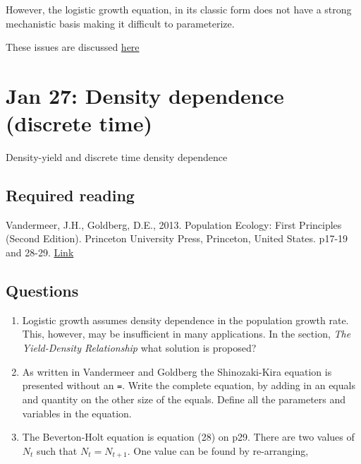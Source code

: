 \documentclass[
]{book}
\begin{document}
However, the logistic growth equation, in its classic form does not have a strong mechanistic basis making it difficult to parameterize.

These issues are discussed \href{https://www.sciencedirect.com/science/article/pii/S030438000400554X?via\%3Dihub}{here}

\hypertarget{jan-27-density-dependence-discrete-time}{%
\chapter{Jan 27: Density dependence (discrete time)}\label{jan-27-density-dependence-discrete-time}}

Density-yield and discrete time density dependence

\hypertarget{required-reading-2}{%
\section{Required reading}\label{required-reading-2}}

Vandermeer, J.H., Goldberg, D.E., 2013. Population Ecology: First Principles (Second Edition). Princeton University Press, Princeton, United States. p17-19 and 28-29. \href{https://ebookcentral-proquest-com.qe2a-proxy.mun.ca/lib/mun/detail.action?docID=1205619}{Link}

\hypertarget{questions-3}{%
\section{Questions}\label{questions-3}}

\begin{enumerate}
\def\labelenumi{\arabic{enumi}.}
\item
  Logistic growth assumes density dependence in the population growth rate. This, however, may be insufficient in many applications. In the section, \emph{The Yield-Density Relationship} what solution is proposed?
\item
  As written in Vandermeer and Goldberg the Shinozaki-Kira equation is presented without an \texttt{=}. Write the complete equation, by adding in an equals and quantity on the other size of the equals. Define all the parameters and variables in the equation.
\item
  The Beverton-Holt equation is equation (28) on p29. There are two values of \(N_t\) such that \(N_t = N_{t+1}\). One value can be found by re-arranging,
\end{enumerate}
\end{document}
